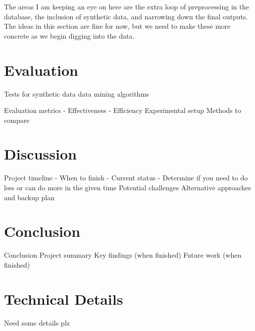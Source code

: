 \documentclass[sigconf, authorversion, nonacm]{acmart}
\begin{document}
    The areas I am keeping an eye on here are the extra loop of preprocessing in the database, the inclusion of synthetic data, and narrowing down the final outputs. The ideas in this section are fine for now, but we need to make these more concrete as we begin digging into the data.

\section{Evaluation}

    Tests for synthetic data
    data mining algorithms




Evaluation metrics
    - Effectiveness
    - Efficiency
Experimental setup
Methods to compare





\section{Discussion}
Project timeline
    - When to finish
    - Current status
    - Determine if you need to do less or can do more in the given time
Potential challenges
Alternative approaches and backup plan



\section{Conclusion}
Conclusion
Project summary
Key findings (when finished)
Future work (when finished)





\appendix

\section{Technical Details}

    Need some details plz
\end{document}

